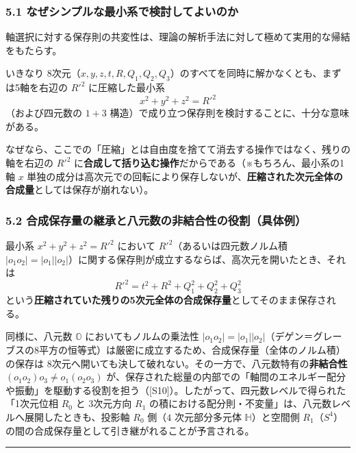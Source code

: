 \documentclass[
  a4paper,
]{ltjsarticle}
\begin{document}
\subsubsection{5.1
なぜシンプルな最小系で検討してよいのか}\label{ux306aux305cux30b7ux30f3ux30d7ux30ebux306aux6700ux5c0fux7cfbux3067ux691cux8a0eux3057ux3066ux3088ux3044ux306eux304b}

軸選択に対する保存則の共変性は、理論の解析手法に対して極めて実用的な帰結をもたらす。

いきなり
8次元（\(x, y, z, t, R, Q_1, Q_2, Q_3\)）のすべてを同時に解かなくとも、まずは5軸を右辺の
\(R'^2\) に圧縮した最小系 \[x^2 + y^2 + z^2 = R'^2\] （および四元数の
\(1 + 3\) 構造）で成り立つ保存則を検討することに、十分な意味がある。

なぜなら、ここでの「圧縮」とは自由度を捨てて消去する操作ではなく、残りの軸を右辺の
\(R'^2\)
に\textbf{合成して括り込む操作}だからである（※もちろん、最小系の1軸
\(x\)
単独の成分は高次元での回転により保存しないが、\textbf{圧縮された次元全体の合成量}としては保存が崩れない）。

\subsubsection{5.2
合成保存量の継承と八元数の非結合性の役割（具体例）}\label{ux5408ux6210ux4fddux5b58ux91cfux306eux7d99ux627fux3068ux516bux5143ux6570ux306eux975eux7d50ux5408ux6027ux306eux5f79ux5272ux5177ux4f53ux4f8b}

最小系 \(x^2 + y^2 + z^2 = R'^2\) において
\(R'^2\)（あるいは四元数ノルム積
\(|o_1 o_2| = |o_1||o_2|\)）に関する保存則が成立するならば、高次元を開いたとき、それは
\[R'^2 = t^2 + R^2 + Q_1^2 + Q_2^2 + Q_3^2\]
という\textbf{圧縮されていた残りの5次元全体の合成保存量}としてそのまま保存される。

同様に、八元数 \(\mathbb{O}\) においてもノルムの乗法性
\(|o_1 o_2| = |o_1||o_2|\)（デゲン＝グレーブスの8平方の恒等式）は厳密に成立するため、合成保存量（全体のノルム積）の保存は
8次元へ開いても決して破れない。その一方で、八元数特有の\textbf{非結合性}
\((o_1 o_2) o_3 \neq o_1 (o_2 o_3)\)
が、保存された総量の内部での「軸間のエネルギー配分や振動」を駆動する役割を担う（{[}S10{]}）。したがって、四元数レベルで得られた「1次元位相
\(R_0\) と 3次元方向 \(R_1\)
の積における配分則・不変量」は、八元数レベルへ展開したときも、投影軸
\(R_0\) 側（\(4\) 次元部分多元体 \(\mathbb{H}\)）と空間側
\(R_1\)（\(S^4\)）の間の合成保存量として引き継がれることが予言される。

\begin{center}\rule{0.5\linewidth}{0.5pt}\end{center}
\end{document}
